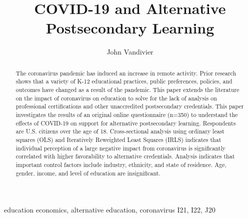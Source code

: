 \documentclass[review]{elsarticle}
\begin{document}
\begin{frontmatter}

    \title{
        COVID-19 and Alternative Postsecondary Learning
    }

    \author[mymainaddress]{John Vandivier}
    \address[mymainaddress]{4400 University Dr, Fairfax, VA 22030}

    \begin{abstract}
        The coronavirus pandemic has induced an increase in remote activity.
        Prior research shows that a variety of K-12 educational practices, public preferences, policies, and outcomes
        have changed as a result of the pandemic.
        This paper extends the literature on the impact of coronavirus on education
        to solve for the lack of analysis on professional certifications
        and other unaccredited postsecondary credentials.
        This paper investigates the results of an original online questionnaire (n=350)
        to understand the effects of COVID-19
        on support for alternative postsecondary learning.
        Respondents are U.S. citizens over the age of 18.
        Cross-sectional analysis using ordinary least squares (OLS)
        and Iteratively Reweighted Least Squares (IRLS)
        indicates that individual perception of a large negative impact from coronavirus
        is significantly correlated with
        higher favorability to alternative credentials.
        Analysis indicates that important control factors include industry, ethnicity, and state of residence.
        Age, gender, income, and level of education are insignificant.
    \end{abstract}

    \begin{keyword}
        education economics, alternative education, coronavirus             %
        \MSC[2010] I21, I22, J20 %
    \end{keyword}

\end{frontmatter}
\end{document}
